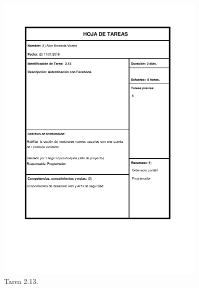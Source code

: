 \documentclass{DeustoFDP}
\begin{document}
\begin{figure}[H]
	\centering
	\includegraphics[width=0.9\textwidth]{fig/Tareas/213}
	\caption{Tarea 2.13.}
	\label{fig:t213}
\end{figure}
\end{document}

